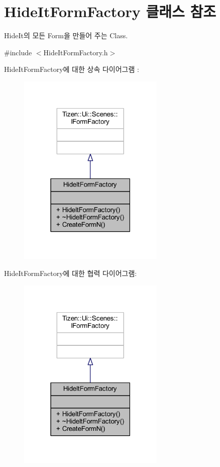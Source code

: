\hypertarget{class_hide_it_form_factory}{\section{Hide\+It\+Form\+Factory 클래스 참조}
\label{class_hide_it_form_factory}
}


Hide\+It의 모든 Form을 만들어 주는 Class.  




{\ttfamily \#include $<$Hide\+It\+Form\+Factory.\+h$>$}



Hide\+It\+Form\+Factory에 대한 상속 다이어그램 \+: 
\nopagebreak
\begin{figure}[H]
\begin{center}
\leavevmode
\includegraphics[width=198pt]{class_hide_it_form_factory__inherit__graph}
\end{center}
\end{figure}


Hide\+It\+Form\+Factory에 대한 협력 다이어그램\+:
\nopagebreak
\begin{figure}[H]
\begin{center}
\leavevmode
\includegraphics[width=198pt]{class_hide_it_form_factory__coll__graph}
\end{center}
\end{figure}

